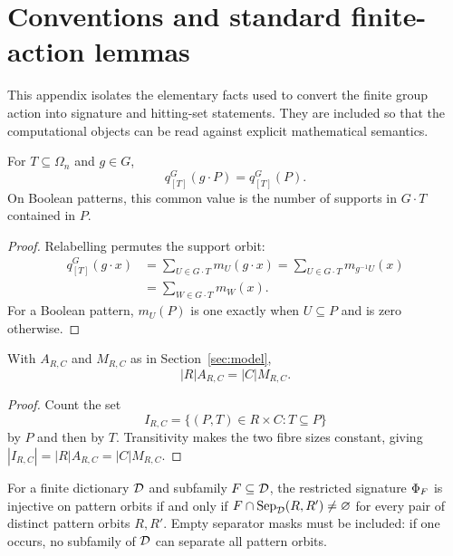\section{Conventions and standard finite-action lemmas}
\label{app:finite-action}

This appendix isolates the elementary facts used to convert the finite group
action into signature and hitting-set statements.  They are included so that
the computational objects can be read against explicit mathematical
semantics.

\begin{lemma}
For $T\subseteq\Omega_n$ and $g\in G$,
\[
 q^G_{[T]}(g\cdot P)=q^G_{[T]}(P).
\]
On Boolean patterns, this common value is the number of supports in
$G\cdot T$ contained in $P$.
\end{lemma}

\begin{proof}
Relabelling permutes the support orbit:
\[
\begin{aligned}
q^G_{[T]}(g\cdot x)
 &=\sum_{U\in G\cdot T}m_U(g\cdot x)
  =\sum_{U\in G\cdot T}m_{g^{-1}U}(x)\\
 &=\sum_{W\in G\cdot T}m_W(x).
\end{aligned}
\]
For a Boolean pattern, $m_U(P)$ is one exactly when $U\subseteq P$ and is zero
otherwise.
\end{proof}

\begin{lemma}
With $A_{R,C}$ and $M_{R,C}$ as in Section~\ref{sec:model},
\[
 |R|A_{R,C}=|C|M_{R,C}.
\]
\end{lemma}

\begin{proof}
Count the set
\[
 I_{R,C}=\{(P,T)\in R\times C:T\subseteq P\}
\]
by $P$ and then by $T$.  Transitivity makes the two fibre sizes constant,
giving $|I_{R,C}|=|R|A_{R,C}=|C|M_{R,C}$.
\end{proof}

\begin{lemma}
For a finite dictionary $\mathcal{D}$ and subfamily $F\subseteq\mathcal{D}$, the restricted
signature $\Phi_F$ is injective on pattern orbits if and only if
$F\cap\operatorname{Sep}_{\mathcal{D}}(R,R')\neq\varnothing$ for every pair of distinct
pattern orbits $R,R'$.  Empty separator masks must be included: if one
occurs, no subfamily of $\mathcal{D}$ can separate all pattern orbits.
\end{lemma}


